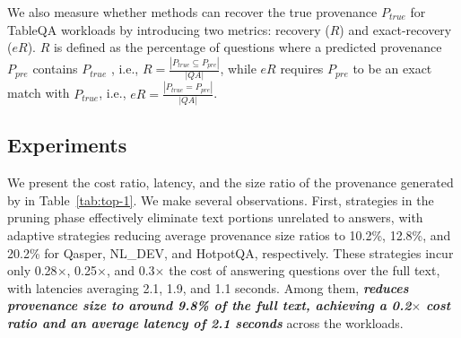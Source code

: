 We also measure whether methods can recover the true provenance $P_{true}$ for  TableQA workloads  by introducing two metrics: recovery ($R$) and exact-recovery ($eR$). 
 $R$ is defined as the percentage of questions where a predicted provenance $P_{pre}$ contains $P_{true}$ , i.e., $R = \frac{|P_{true} \subseteq P_{pre}|}{|QA|}$, while $eR$ requires $P_{pre}$ to be an exact match with $P_{true}$, i.e., $eR = \frac{|P_{true} = P_{pre}|}{|QA|}$. 











\vspace{-1em}
\subsection{Experiments}  
\label{subsec:exp-result}

We present the cost ratio, latency, and the size ratio of the provenance generated by \sys in Table~\ref{tab:top-1}. We make several observations. First, strategies in the pruning phase effectively eliminate text portions unrelated to answers, with adaptive strategies  reducing average provenance size ratios to 10.2\%, 12.8\%, and 20.2\% for Qasper, NL\_DEV, and HotpotQA,  respectively. These strategies incur only 0.28$\times$, 0.25$\times$, and 0.3$\times$ the cost of answering questions over the full text, with latencies averaging 2.1, 1.9, and 1.1 seconds. Among them,  {\bf \em reduces provenance size to around 9.8\% of the full text, achieving a 0.2$\times$ cost ratio and an average latency of 2.1 seconds} across the workloads. 

